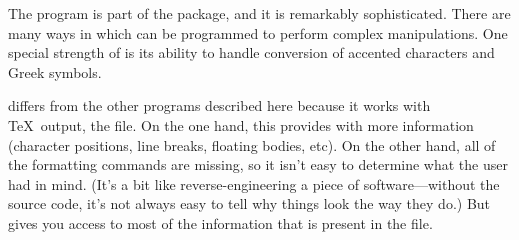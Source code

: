 The  program is part of the  package, and it is
remarkably sophisticated.  There are many ways in which 
can be programmed to perform complex manipulations.  One special strength
of  is its ability to handle conversion of accented 
characters and Greek symbols.

 differs from the other programs described here
because it works with \TeX\ output, the  file.  On the one
hand, this provides  with more information
(character positions, line breaks, floating bodies, etc).  On the
other hand, all of the formatting commands are missing, so it isn't
easy to determine what the user had in mind. (It's a bit like
reverse-engineering a piece of software---without the source code,
it's not always easy to tell why things look the way they do.)  But
 gives you access to most of the information that is
present in the  file.
